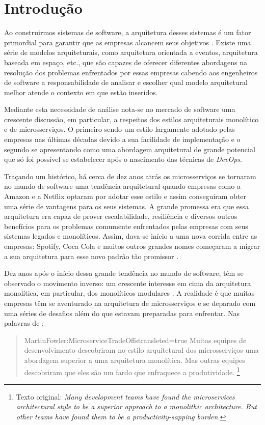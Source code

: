 \chapter[Introdução]{Introdução}

Ao construirmos sistemas de software, a arquitetura desses sistemas é um fator primordial para
garantir que as empresas alcancem seus objetivos \cite{Bass2015:SoftwareArchitetureInPratice}.
Existe uma série de modelos arquiteturais, como arquitetura orientada a eventos, arquitetura baseada
em espaço, etc., que são capazes de oferecer diferentes abordagens na resolução dos problemas
enfrentados por essas empresas cabendo aos engenheiros de software a responsabilidade de analisar e
escolher qual modelo arquitetural melhor atende o contexto em que estão inseridos.

Mediante esta necessidade de análise nota-se no mercado de software uma crescente discussão, em
particular, a respeitos dos estilos arquiteturais monolítico e de microsserviços. O primeiro sendo
um estilo largamente adotado pelas empresas nas últimas décadas devido a sua facilidade de implementação
e o segundo se apresentando como uma abordagem arquitetural de grande potencial que só foi possível
se estabelecer após o nascimento das técnicas de \textit{DevOps}.

Traçando um histórico, há cerca de dez anos atrás os microsserviços se tornaram no mundo de
software uma tendência arquitetural quando empresas como a Amazon e a Netflix optaram por adotar esse
estilo e assim conseguiram obter uma série de vantagens para os seus sistemas. A grande promessa era que essa
arquitetura era capaz de prover escalabilidade, resiliência e diversos outros benefícios para os
problemas comumente enfrentados pelas empresas com seus sistemas legados e monolíticos. Assim,
dava-se início a uma nova corrida entre as empresas: Spotify, Coca Cola e muitos outros
grandes nomes começaram a migrar a sua arquitetura para esse novo padrão tão promissor
\cite{Aleksandra2019}.

Dez anos após o início dessa grande tendência no mundo de software, têm se observado o movimento
inverso: um crescente interesse em cima da arquitetura monolítica, em particular, dos monolíticos
modulares \cite{QTrends}. A realidade é que muitas empresas têm se aventurado na arquitetura de
microsserviços e se deparado com uma séries de desafios além do que estavam preparadas para
enfrentar. Nas palavras de :

\begin{quotation}{MartinFowler:MicroserviceTradeOffs}{transleted=true}
    Muitas equipes de desenvolvimento descobriram no estilo arquitetural dos microsserviços uma
    abordagem superior a uma arquitetura monolítica. Mas outras equipes descobriram que eles
    são um fardo que enfraquece a produtividade. \footnote{Texto original: \textit{Many
    development teams have found the microservices architectural style to be a superior approach
    to a monolithic architecture. But other teams have found them to be a productivity-sapping
    burden.}}
\end{quotation}

